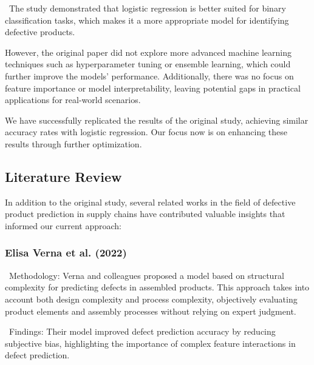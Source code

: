 \documentclass[conference]{IEEEtran}
\begin{document}
\noindent \textbullet\ The study demonstrated that logistic regression is better suited for binary classification tasks, which makes it a more appropriate model for identifying defective products.

However, the original paper did not explore more advanced machine learning techniques such as hyperparameter tuning or ensemble learning, which could further improve the models' performance. Additionally, there was no focus on feature importance or model interpretability, leaving potential gaps in practical applications for real-world scenarios.

We have successfully replicated the results of the original study, achieving similar accuracy rates with logistic regression. Our focus now is on enhancing these results through further optimization.

\subsection{Literature Review}
In addition to the original study, several related works in the field of defective product prediction in supply chains have contributed valuable insights that informed our current approach:


\subsubsection{Elisa Verna et al. (2022) \cite{verna2022defect}}

\noindent \textbullet\ Methodology: Verna and colleagues proposed a model based on structural complexity for predicting defects in assembled products. This approach takes into account both design complexity and process complexity, objectively evaluating product elements and assembly processes without relying on expert judgment.

\noindent \textbullet\ Findings: Their model improved defect prediction accuracy by reducing subjective bias, highlighting the importance of complex feature interactions in defect prediction.
\end{document}
